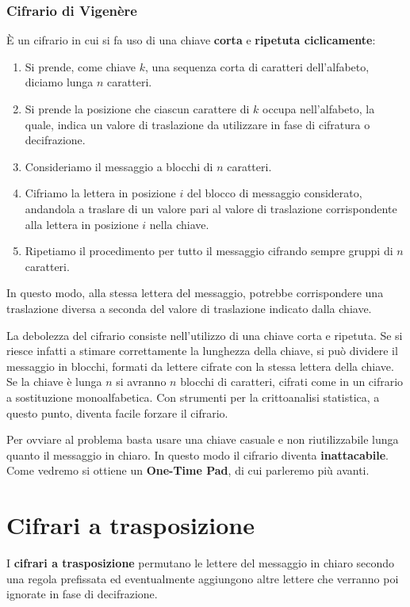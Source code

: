 \subsubsection{Cifrario di Vigen\`ere}
\`E un cifrario in cui si fa uso di una chiave \textbf{corta} e \textbf{ripetuta ciclicamente}:
\begin{enumerate}
	\item Si prende, come chiave $k$, una sequenza corta di caratteri dell'alfabeto, diciamo lunga $n$ caratteri.
	\item Si prende la posizione che ciascun carattere di $k$ occupa nell'alfabeto, la quale, indica un valore di
	      traslazione da utilizzare in fase di cifratura o decifrazione.
	\item Consideriamo il messaggio a blocchi di $n$ caratteri.
	\item Cifriamo la lettera in posizione $i$ del blocco di messaggio considerato, andandola a traslare di un valore
	      pari al valore di traslazione corrispondente alla lettera in posizione $i$ nella chiave.
	\item Ripetiamo il procedimento per tutto il messaggio cifrando sempre gruppi di $n$ caratteri.
\end{enumerate}
In questo modo, alla stessa lettera del messaggio, potrebbe corrispondere una traslazione diversa a seconda del valore di
traslazione indicato dalla chiave.

La debolezza del cifrario consiste nell'utilizzo di una chiave corta e ripetuta. Se si riesce infatti a stimare
correttamente la lunghezza della chiave, si pu\`o dividere il messaggio in blocchi, formati da lettere cifrate con la
stessa lettera della chiave. Se la chiave \`e lunga $n$ si avranno $n$ blocchi di caratteri, cifrati come in un
cifrario a sostituzione monoalfabetica. Con strumenti per la crittoanalisi statistica, a questo punto, diventa facile
forzare il cifrario.

Per ovviare al problema basta usare una chiave casuale e non riutilizzabile lunga quanto il messaggio in chiaro. In
questo modo il cifrario diventa \textbf{inattacabile}. Come vedremo si ottiene un \textbf{One-Time Pad}, di cui
parleremo pi\`u avanti.

\section{Cifrari a trasposizione}\label{trasposizione}
I \textbf{cifrari a trasposizione} permutano le lettere del messaggio in chiaro secondo una regola prefissata ed
eventualmente aggiungono altre lettere che verranno poi ignorate in fase di decifrazione.

